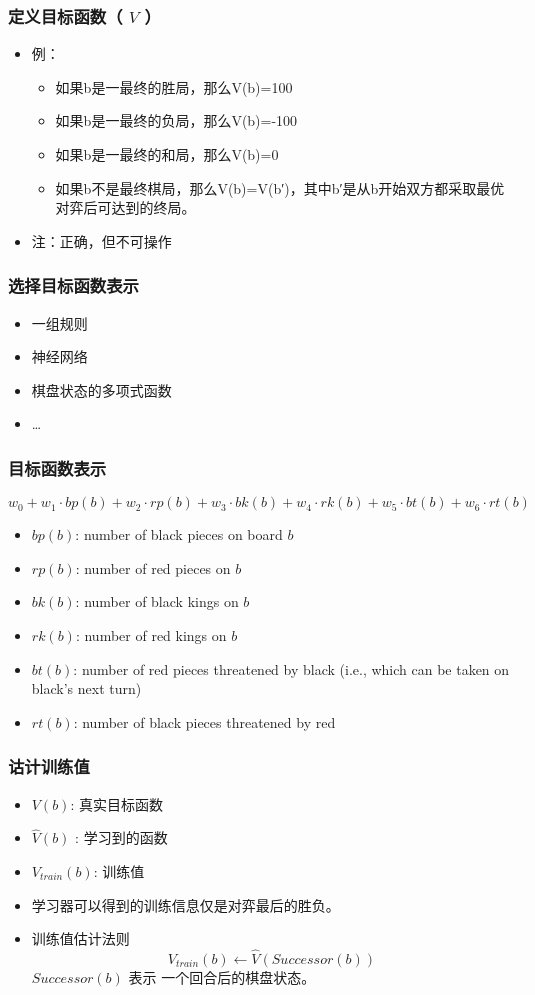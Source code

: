 \documentclass{beamer}
\begin{document}
\begin{frame}
\frametitle{定义目标函数（ $V$ ）}
\label{sec-4-4}

\begin{itemize}
\item 例：
\begin{itemize}
\item 如果b是一最终的胜局，那么V(b)=100
\item 如果b是一最终的负局，那么V(b)=-100
\item 如果b是一最终的和局，那么V(b)=0
\item 如果b不是最终棋局，那么V(b)=V(b′)，其中b′是从b开始双方都采取最优对弈后可达到的终局。
\end{itemize}
\item 注：正确，但不可操作
\end{itemize}
\end{frame}
\begin{frame}
\frametitle{选择目标函数表示}
\label{sec-4-5}


\begin{itemize}
\item 一组规则
\item 神经网络
\item 棋盘状态的多项式函数
\item \ldots{}
\end{itemize}
\end{frame}
\begin{frame}
\frametitle{目标函数表示}
\label{sec-4-6}

\[ w_{0} + w_{1}\cdot bp(b) + w_{2}\cdot rp(b) + w_{3}\cdot bk(b) + w_{4}\cdot rk(b) + w_{5}\cdot bt(b) + w_{6}\cdot rt(b) \]

\begin{itemize}
\item $bp(b)$: number of black pieces on board $b$
\item $rp(b)$: number of red pieces on $b$
\item $bk(b)$: number of black kings on $b$
\item $rk(b)$: number of red kings on $b$
\item $bt(b)$: number of red pieces threatened by black (i.e., which can be taken
         on black's next turn)
\item $rt(b)$:  number of black pieces threatened by red
\end{itemize}
\end{frame}
\begin{frame}
\frametitle{诂计训练值}
\label{sec-4-7}


\begin{itemize}
\item $V(b)$: 真实目标函数
\item $\hat{V}(b)$ : 学习到的函数
\item $V_{train}(b)$: 训练值
\item 学习器可以得到的训练信息仅是对弈最后的胜负。
\item 训练值估计法则
   $$V_{train}(b) \leftarrow \hat{V}(Successor(b))$$
   $Successor(b)$ 表示 一个回合后的棋盘状态。
\end{itemize}
\end{frame}
\end{document}
